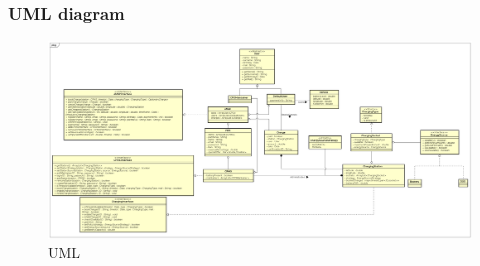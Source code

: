 
\clearpage
\subsubsection{UML diagram}
\begin{figure}[h!]
      \begin{center}
            \includegraphics[keepaspectratio, width=16cm]{UML.png}
            \caption{UML}
      \end{center}
\end{figure}
